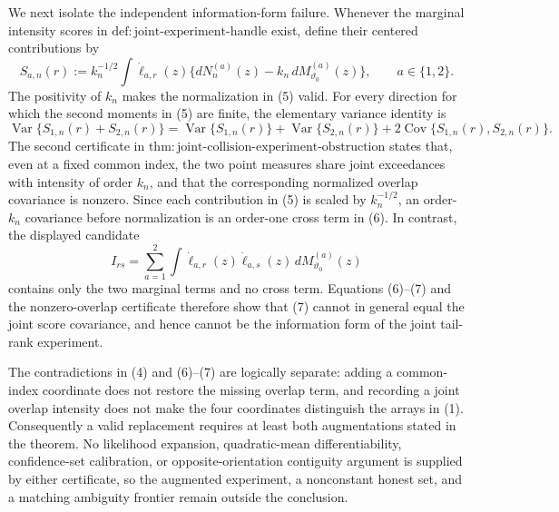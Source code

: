 We next isolate the independent information-form failure.  Whenever the marginal intensity scores in \(\mathrm{def{:}joint\text{-}experiment\text{-}handle}\) exist, define their centered contributions by
\[
 S_{a,n}(r)
 :=k_n^{-1/2}\int\dot\ell_{a,r}(z)
 \{dN_n^{(a)}(z)-k_n\,dM_{\vartheta_0}^{(a)}(z)\},
 \qquad a\in\{1,2\}.
 \tag{5}
\]
The positivity of \(k_n\) makes the normalization in (5) valid.  For every direction for which the second moments in (5) are finite, the elementary variance identity is
\[
 \operatorname{Var}\{S_{1,n}(r)+S_{2,n}(r)\}
 =\operatorname{Var}\{S_{1,n}(r)\}
 +\operatorname{Var}\{S_{2,n}(r)\}
 +2\operatorname{Cov}\{S_{1,n}(r),S_{2,n}(r)\}.
 \tag{6}
\]
The second certificate in \(\mathrm{thm{:}joint\text{-}collision\text{-}experiment\text{-}obstruction}\) states that, even at a fixed common index, the two point measures share joint exceedances with intensity of order \(k_n\), and that the corresponding normalized overlap covariance is nonzero.  Since each contribution in (5) is scaled by \(k_n^{-1/2}\), an order-\(k_n\) covariance before normalization is an order-one cross term in (6).  In contrast, the displayed candidate
\[
 I_{rs}=\sum_{a=1}^2\int\dot\ell_{a,r}(z)\dot\ell_{a,s}(z)\,dM_{\vartheta_0}^{(a)}(z)
 \tag{7}
\]
contains only the two marginal terms and no cross term.  Equations (6)--(7) and the nonzero-overlap certificate therefore show that (7) cannot in general equal the joint score covariance, and hence cannot be the information form of the joint tail-rank experiment.

The contradictions in (4) and (6)--(7) are logically separate: adding a common-index coordinate does not restore the missing overlap term, and recording a joint overlap intensity does not make the four coordinates distinguish the arrays in (1).  Consequently a valid replacement requires at least both augmentations stated in the theorem.  No likelihood expansion, quadratic-mean differentiability, confidence-set calibration, or opposite-orientation contiguity argument is supplied by either certificate, so the augmented experiment, a nonconstant honest set, and a matching ambiguity frontier remain outside the conclusion.